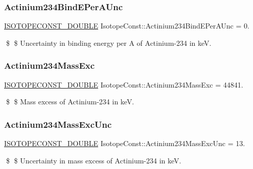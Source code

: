 \subsubsection{\texorpdfstring{Actinium234\+Bind\+E\+Per\+A\+Unc}{Actinium234BindEPerAUnc}}
{\footnotesize\ttfamily \mbox{\hyperlink{group___isotope_const-_macros_ga8f45a7272ce02c0b4c65c44636ed719a}{I\+S\+O\+T\+O\+P\+E\+C\+O\+N\+S\+T\+\_\+\+D\+O\+U\+B\+LE}} Isotope\+Const\+::\+Actinium234\+Bind\+E\+Per\+A\+Unc = 0.}

\$ \$ Uncertainty in binding energy per A of Actinium-\/234 in keV. \mbox{\label{group___isotope_const-_actinium-_ac234_gab4fd9d6d1c582087609d0c849b3704bf}} 
\subsubsection{\texorpdfstring{Actinium234\+Mass\+Exc}{Actinium234MassExc}}
{\footnotesize\ttfamily \mbox{\hyperlink{group___isotope_const-_macros_ga8f45a7272ce02c0b4c65c44636ed719a}{I\+S\+O\+T\+O\+P\+E\+C\+O\+N\+S\+T\+\_\+\+D\+O\+U\+B\+LE}} Isotope\+Const\+::\+Actinium234\+Mass\+Exc = 44841.}

\$ \$ Mass excess of Actinium-\/234 in keV. \mbox{\label{group___isotope_const-_actinium-_ac234_ga49a6e0bdb459f0ecbd66c4b7938aa534}} 
\subsubsection{\texorpdfstring{Actinium234\+Mass\+Exc\+Unc}{Actinium234MassExcUnc}}
{\footnotesize\ttfamily \mbox{\hyperlink{group___isotope_const-_macros_ga8f45a7272ce02c0b4c65c44636ed719a}{I\+S\+O\+T\+O\+P\+E\+C\+O\+N\+S\+T\+\_\+\+D\+O\+U\+B\+LE}} Isotope\+Const\+::\+Actinium234\+Mass\+Exc\+Unc = 13.}

\$ \$ Uncertainty in mass excess of Actinium-\/234 in keV. \mbox{\label{group___isotope_const-_actinium-_ac234_ga6a383b847cd844b6a53703132b1c6e10}} 
